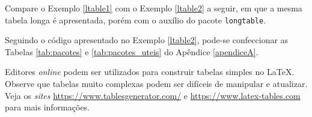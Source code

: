 Compare o Exemplo \ref{ltable1} com o Exemplo \ref{ltable2} a seguir, em que a mesma tabela longa é apresentada, porém com o auxílio do pacote {\tt longtable}.


Seguindo o código apresentado no Exemplo \ref{ltable2}, pode-se confeccionar as Tabelas \ref{tab:pacotes} e \ref{tab:pacotes_uteis} do Apêndice \ref{apendiceA}.

\begin{marker}
Editores \textit{online} podem ser utilizados para construir tabelas simples no \LaTeX{}. Observe que tabelas muito complexas podem ser difíceis de manipular e atualizar. Veja os \textit{sites} \url{https://www.tablesgenerator.com/} e \url{https://www.latex-tables.com} para mais informações.
\end{marker}

